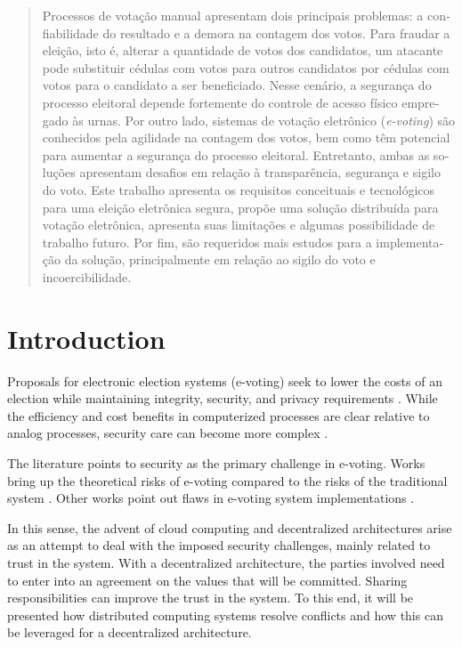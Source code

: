 \documentclass[english]{textolivre}
\begin{document}
\begin{polyabstract}
\begin{portuguese}
\begin{abstract}
Processos de votação manual apresentam dois principais problemas: a confiabilidade do resultado e a demora na contagem dos votos. Para fraudar a eleição, isto é, alterar a quantidade de votos dos candidatos, um atacante pode substituir cédulas com votos para outros candidatos por cédulas com votos para o candidato a ser beneficiado. Nesse cenário, a segurança do processo eleitoral depende fortemente do controle de acesso físico empregado às urnas. Por outro lado, sistemas de votação eletrônico (\textit{e-voting}) são conhecidos pela agilidade na contagem dos votos, bem como têm potencial para aumentar a segurança do processo eleitoral. Entretanto, ambas as soluções apresentam desafios em relação à transparência, segurança e sigilo do voto. Este trabalho apresenta os requisitos conceituais e tecnológicos para uma eleição eletrônica segura, propõe uma solução distribuída para votação eletrônica, apresenta suas limitações e algumas possibilidade de trabalho futuro. Por fim, são requeridos mais estudos para a implementação da solução, principalmente em relação ao sigilo do voto e incoercibilidade.

\end{abstract}
\end{portuguese}
\end{polyabstract}

\section{Introduction}\label{sec-intro}

Proposals for electronic election systems (e-voting) seek to lower the costs of an election while maintaining integrity, security, and privacy requirements \cite{hjal}. While the efficiency and cost benefits in computerized processes are clear relative to analog processes, security care can become more complex \cite{stallings}.

The literature points to security as the primary challenge in e-voting. Works bring up the theoretical risks of e-voting compared to the risks of the traditional system \cite{lauer2004risk, Gritzalis}. Other works point out flaws in e-voting system implementations \cite{estonia, aranha}.

In this sense, the advent of cloud computing and decentralized architectures arise as an attempt to deal with the imposed security challenges, mainly related to trust in the system. With a decentralized architecture, the parties involved need to enter into an agreement on the values that will be committed. Sharing responsibilities can improve the trust in the system. To this end, it will be presented how distributed computing systems resolve conflicts and how this can be leveraged for a decentralized architecture. %
\end{document}

